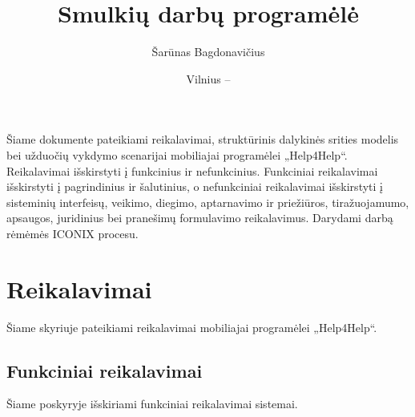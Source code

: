 \documentclass{VUMIFPSbakalaurinis}
\title{Smulkių darbų programėlė}
\author{Šarūnas Bagdonavičius}
\date{Vilnius – \the\year}
\begin{document}
\maketitle
\tableofcontents

Šiame dokumente pateikiami reikalavimai, struktūrinis dalykinės srities modelis bei užduočių vykdymo scenarijai mobiliajai programėlei „Help4Help“. Reikalavimai išskirstyti į funkcinius ir nefunkcinius. Funkciniai reikalavimai išskirstyti į pagrindinius ir šalutinius, o nefunkciniai reikalavimai išskirstyti į sisteminių interfeisų, veikimo, diegimo, aptarnavimo ir priežiūros, tiražuojamumo, apsaugos, juridinius bei pranešimų formulavimo reikalavimus. Darydami darbą rėmėmės ICONIX procesu.

\section{Reikalavimai}
Šiame skyriuje pateikiami reikalavimai mobiliajai programėlei „Help4Help“.
\subsection{Funkciniai reikalavimai}
Šiame poskyryje išskiriami funkciniai reikalavimai sistemai.
\end{document}
